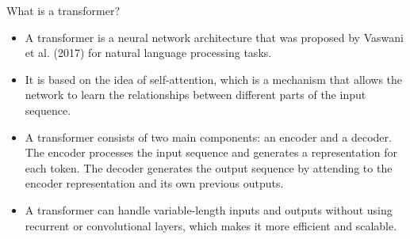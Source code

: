 \documentclass[USenglish,pdftex,compress,10pt,svgnamesi,handout]{beamer}
\newcommand{\bfw}{\Vec{w}}
\newcommand{\bfx}{\Vec{x}}
\newcommand{\bfz}{\Vec{z}}
\def\cl#1{{\cal #1}}
\begin{document}










\begin{frame}{What is a transformer?}
\begin{itemize}
    \item A transformer is a neural network architecture that was proposed by Vaswani et al. (2017) for natural language processing tasks.
    \item It is based on the idea of self-attention, which is a mechanism that allows the network to learn the relationships between different parts of the input sequence.
    \item A transformer consists of two main components: an encoder and a decoder. The encoder processes the input sequence and generates a representation for each token. The decoder generates the output sequence by attending to the encoder representation and its own previous outputs.
    \item A transformer can handle variable-length inputs and outputs without using recurrent or convolutional layers, which makes it more efficient and scalable.
\end{itemize}
\end{frame}
\end{document}

